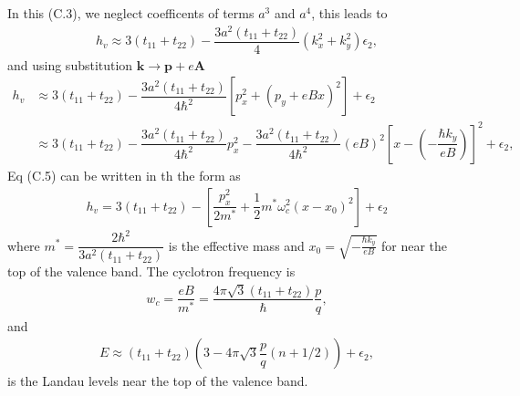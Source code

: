 \documentclass{report}
\newcommand{\f}[2]{\dfrac{#1}{#2}}
\begin{document}
In this (C.3), we neglect coefficents of terms $a^{3}$ and $a^{4}$, this leads to
\begin{gather}
	h_{v} \approx 3(t_{11} + t_{22}) - \f{3a^{2}(t_{11} + t_{22})}{4} \left(k_{x}^{2} + k_{y}^{2}\right) \epsilon_{2},
\end{gather}
and using substitution $\mathbf{k} \rightarrow \mathbf{p} + e\mathbf{A}$
\begin{equation}
	\begin{aligned}
		h_{v}
		 & \approx 3 (t_{11} + t_{22}) - \f{3a^{2}(t_{11} + t_{22})}{4\hbar^{2}} \left[p_{x}^{2} + (p_{y} + eBx)^{2}\right] + \epsilon_{2}                                                                           \\
		 & \approx 3 (t_{11} + t_{22}) - \f{3a^{2}(t_{11} + t_{22})}{4\hbar^{2}} p_{x}^{2} - \f{3a^{2}(t_{11} + t_{22})}{4\hbar^{2}} (eB)^{2} \left[x - \left(-\f{\hbar k_{y}}{eB}\right)\right]^{2} + \epsilon_{2},
	\end{aligned}
\end{equation}
Eq (C.5) can be written in th the form as
\begin{gather}
	h_{v} = 3 (t_{11} + t_{22}) - \left[\f{p_{x}^{2}}{2m^{*}} + \f{1}{2}m^{*} \omega_{c}^{2}(x - x_{0})^{2}\right] + \epsilon_{2}
\end{gather}
where $m^{*} = \f{2\hbar^{2}}{3a^{2}(t_{11} + t_{22})}$ is the effective mass  and $x_{0} = \sqrt{-\frac{\hbar k_{y}}{eB}}$ for near the top of the valence band. The cyclotron frequency is
\begin{gather}
	w_{c} = \f{eB}{m^{*}} = \f{4 \pi \sqrt{3} (t_{11} + t_{22})}{\hbar} \f{p}{q},
\end{gather}
and
\begin{gather}
	E \approx (t_{11} + t_{22}) \left(3 - 4\pi \sqrt{3} \f{p}{q}(n + 1/ 2)\right) + \epsilon_{2},
\end{gather}
is the Landau levels near the top of the valence band.
\end{document}
